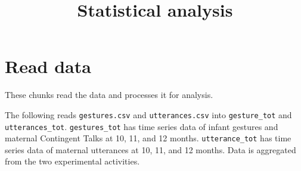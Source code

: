 \documentclass[]{article}
\title{Statistical analysis}
\author{}
\date{}
\begin{document}
\maketitle

\hypertarget{read-data}{%
\section{Read data}\label{read-data}}

These chunks read the data and processes it for analysis.

The following reads \texttt{gestures.csv} and \texttt{utterances.csv}
into \texttt{gesture\_tot} and \texttt{utterances\_tot}.
\texttt{gestures\_tot} has time series data of infant gestures and
maternal Contingent Talks at 10, 11, and 12 months.
\texttt{utterance\_tot} has time series data of maternal utterances at
10, 11, and 12 months. Data is aggregated from the two experimental
activities.
\end{document}
